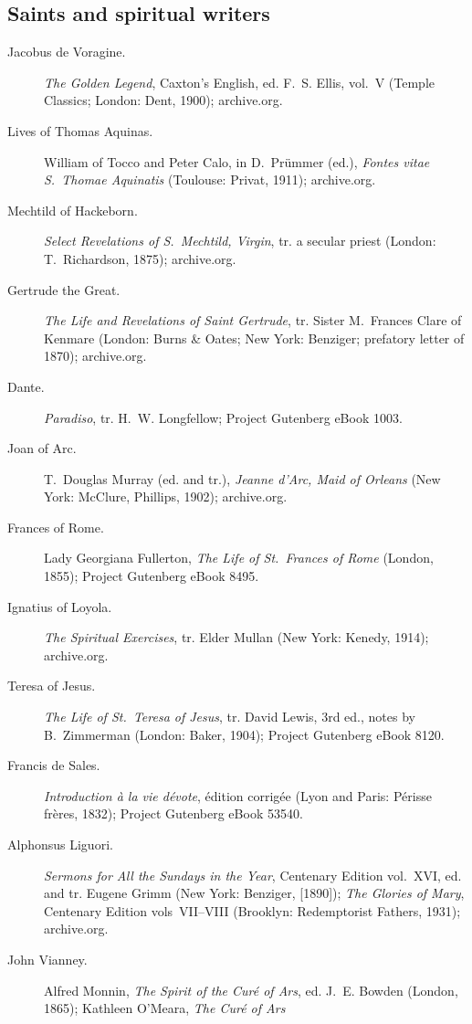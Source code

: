 \subsection*{Saints and spiritual writers}
\begin{description}
\item[Jacobus de Voragine.] \emph{The Golden Legend}, Caxton's English, ed.
  F.~S. Ellis, vol.~V (Temple Classics; London: Dent, 1900); archive.org.
\item[Lives of Thomas Aquinas.] William of Tocco and Peter Calo, in
  D.~Prümmer (ed.), \emph{Fontes vitae S.~Thomae Aquinatis} (Toulouse:
  Privat, 1911); archive.org.
\item[Mechtild of Hackeborn.] \emph{Select Revelations of S.~Mechtild,
  Virgin}, tr. a secular priest (London: T.~Richardson, 1875);
  archive.org.
\item[Gertrude the Great.] \emph{The Life and Revelations of Saint
  Gertrude}, tr. Sister M.~Frances Clare of Kenmare (London: Burns \&
  Oates; New York: Benziger; prefatory letter of 1870); archive.org.
\item[Dante.] \emph{Paradiso}, tr. H.~W. Longfellow; Project Gutenberg
  eBook 1003.
\item[Joan of Arc.] T.~Douglas Murray (ed. and tr.), \emph{Jeanne d'Arc,
  Maid of Orleans} (New York: McClure, Phillips, 1902); archive.org.
\item[Frances of Rome.] Lady Georgiana Fullerton, \emph{The Life of
  St.\ Frances of Rome} (London, 1855); Project Gutenberg eBook 8495.
\item[Ignatius of Loyola.] \emph{The Spiritual Exercises}, tr. Elder
  Mullan (New York: Kenedy, 1914); archive.org.
\item[Teresa of Jesus.] \emph{The Life of St.\ Teresa of Jesus}, tr. David
  Lewis, 3rd ed., notes by B.~Zimmerman (London: Baker, 1904); Project
  Gutenberg eBook 8120.
\item[Francis de Sales.] \emph{Introduction à la vie dévote}, édition
  corrigée (Lyon and Paris: Périsse frères, 1832); Project Gutenberg eBook
  53540.
\item[Alphonsus Liguori.] \emph{Sermons for All the Sundays in the Year},
  Centenary Edition vol.~XVI, ed. and tr. Eugene Grimm (New York:
  Benziger, [1890]); \emph{The Glories of Mary}, Centenary Edition
  vols~VII--VIII (Brooklyn: Redemptorist Fathers, 1931); archive.org.
\item[John Vianney.] Alfred Monnin, \emph{The Spirit of the Curé of Ars},
  ed. J.~E. Bowden (London, 1865); Kathleen O'Meara, \emph{The Curé of Ars}

\end{description}
